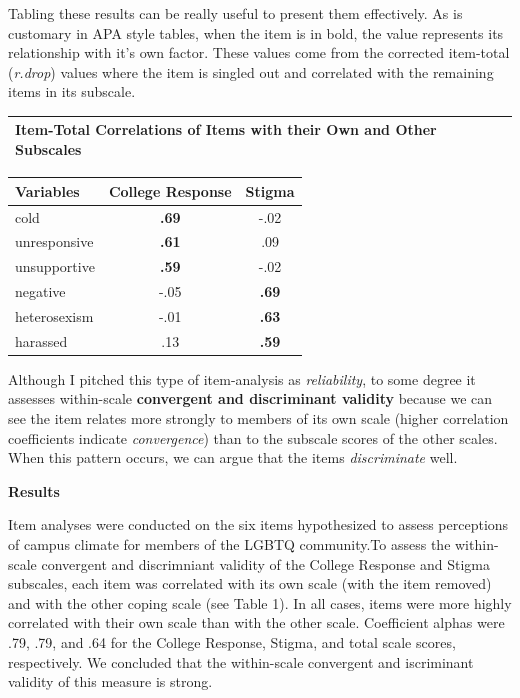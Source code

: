 \documentclass[
  english,
]{book}
\begin{document}
Tabling these results can be really useful to present them effectively. As is customary in APA style tables, when the item is in bold, the value represents its relationship with it's own factor. These values come from the corrected item-total (\emph{r.drop}) values where the item is singled out and correlated with the remaining items in its subscale.

\begin{longtable}[]{@{}l@{}}
\toprule
Item-Total Correlations of Items with their Own and Other Subscales \\
\midrule
\endhead
\bottomrule
\end{longtable}

\begin{longtable}[]{@{}lcc@{}}
\toprule
Variables & College Response & Stigma \\
\midrule
\endhead
cold & \textbf{.69} & -.02 \\
unresponsive & \textbf{.61} & .09 \\
unsupportive & \textbf{.59} & -.02 \\
negative & -.05 & \textbf{.69} \\
heterosexism & -.01 & \textbf{.63} \\
harassed & .13 & \textbf{.59} \\
\bottomrule
\end{longtable}

Although I pitched this type of item-analysis as \emph{reliability}, to some degree it assesses within-scale \textbf{convergent and discriminant validity} because we can see the item relates more strongly to members of its own scale (higher correlation coefficients indicate \emph{convergence}) than to the subscale scores of the other scales. When this pattern occurs, we can argue that the items \emph{discriminate} well.

\textbf{Results}

Item analyses were conducted on the six items hypothesized to assess perceptions of campus climate for members of the LGBTQ community.To assess the within-scale convergent and discrimniant validity of the College Response and Stigma subscales, each item was correlated with its own scale (with the item removed) and with the other coping scale (see Table 1). In all cases, items were more highly correlated with their own scale than with the other scale. Coefficient alphas were .79, .79, and .64 for the College Response, Stigma, and total scale scores, respectively. We concluded that the within-scale convergent and iscriminant validity of this measure is strong.
\end{document}
